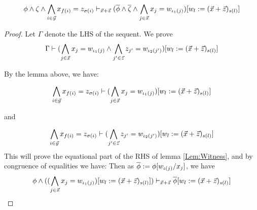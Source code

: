   
\begin{lemma}\label{Lem:Witness}
  \begin{equation*}
    \phi\land \zeta\land \bigwedge_{i\in \vec{y}} x_{f(i)} = z_{\sigma(i)}\vdash_{\vec{x} + \vec{z}} (\overline{\phi}\land \overline{\zeta}\land\bigwedge_{j\in\vec{x}} x_j = w_{\iota_1(j)})[w_l:=(\vec{x}+\vec{z})_{s(l)}] 
  \end{equation*}
\end{lemma}

\begin{proof}
  Let $\Gamma$ denote the LHS of the sequent. We prove 
  \begin{equation*}
    \Gamma \vdash (\bigwedge_{j\in\vec{x}}x_j = w_{\iota_1(j)}\land \bigwedge_{j'\in\vec{z}}z_{j'}= w_{\iota_2(j')}) [w_l:=(\vec{x}+\vec{z})_{s(l)}] 
  \end{equation*}

  By the lemma above, we have:
  
  \begin{equation*}
   \bigwedge_{i\in \vec{y}} x_{f(i)} = z_{\sigma(i)} \vdash 
    (\bigwedge_{j\in\vec{x}}x_j = w_{\iota_1(j)}) [w_l:=(\vec{x}+\vec{z})_{s(l)}] 
  \end{equation*}

  and 

  \begin{equation*}
    \bigwedge_{i\in \vec{y}} x_{f(i)} = z_{\sigma(i)} \vdash 
    (\bigwedge_{j'\in\vec{z}}z_{j'}= w_{\iota_2(j')}) [w_l:=(\vec{x}+\vec{z})_{s(l)}] 
  \end{equation*}
  This will prove the equational part of the RHS of lemma \ref{Lem:Witness}, and by congruence of equalities we have:
  Then as $\overline{\phi} := \phi[w_{\iota(j)}/x_j]$, we have 
  \begin{equation*}
    \phi\land ((\bigwedge_{j\in\vec{x}}x_j = w_{\iota_1(j)})[w_l:=(\vec{x}+\vec{z})_{s(l)}])  \vdash_{\vec{x} + \vec{z}} \overline{\phi} [w_l:=(\vec{x}+\vec{z})_{s(l)}] 
  \end{equation*}

  

  



\end{proof}

